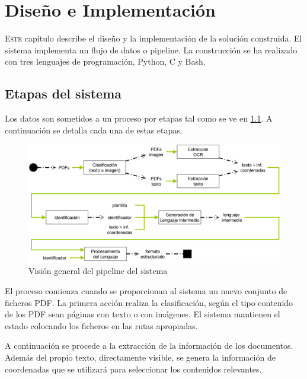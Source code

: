 
\chapter{Diseño e Implementación}
\label{chap:implemetación}

\lettrine{E}{ste} capítulo describe el diseño y la implementación de la solución construida. El sistema implementa un flujo de datos o pipeline. La construcción se ha realizado con tres lenguajes de programación, Python, C y Bash.

\section{Etapas del sistema}

Los datos son sometidos a un proceso por etapas tal como se ve en \ref{fig:vision-general-del-sistema}. A continuación se detalla cada una de estas etapas.

\begin{figure}[hp!]
    \centering
    \includegraphics[width=1.0\textwidth]{imaxes/h-implementacion/vision-general-del-sistema-2}
    \caption{Visión general del pipeline del sistema}
    \label{fig:vision-general-del-sistema}
\end{figure}

El proceso comienza cuando se proporcionan al sistema un nuevo conjunto de ficheros PDF. La primera acción realiza la clasificación, según el tipo contenido de los PDF sean páginas con texto o con imágenes. El sistema mantienen el estado colocando los ficheros en las rutas apropiadas. 

A continuación se procede a la extracción de la información de los documentos. Además del propio texto, directamente visible, se genera la información de coordenadas que se utilizará para seleccionar los contenidos relevantes.

